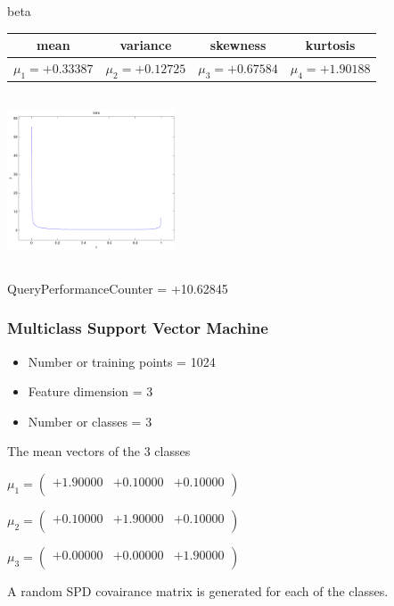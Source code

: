 \documentclass[9pt]{article}
\theoremstyle{plain}
\theoremstyle{definition}
\theoremstyle{remark}
\numberwithin{equation}{section}
\begin{document}
\newpage
beta \begin{tabular}{|c|c|c|c|}  mean & variance & skewness & kurtosis \\  \hline
$\mu_1 = +0.33387$ & $\mu_2 = +0.12725$ & $\mu_3 = +0.67584$ & $\mu_4 =+1.90188$ \\
\end{tabular}

\includegraphics[width=5cm,height=5cm]{beta.pdf}

QueryPerformanceCounter  =  +10.62845
\subsubsection{Multiclass Support Vector Machine }
\begin{itemize}
\item Number or training points = 1024
\item Feature dimension = 3
\item Number or classes = 3
\end{itemize}
{The mean vectors of the 3 classes}

$\mu_1 = \left(
\begin{array}{
ccc}
+1.90000 & +0.10000 & +0.10000 \\
\end{array}
\right)$ \newline 

$\mu_2 = \left(
\begin{array}{
ccc}
+0.10000 & +1.90000 & +0.10000 \\
\end{array}
\right)$ \newline 

$\mu_3 = \left(
\begin{array}{
ccc}
+0.00000 & +0.00000 & +1.90000 \\
\end{array}
\right)$ \newline 

A random SPD covairance matrix is generated for each of the classes.\newline
\end{document}
